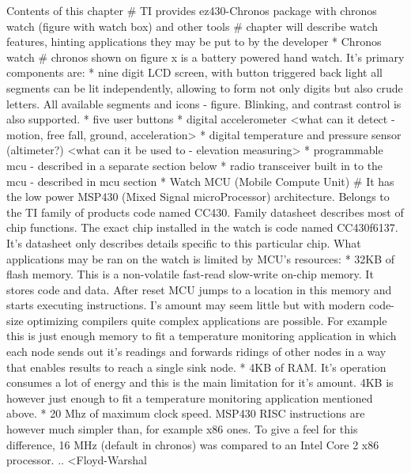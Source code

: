 \begin{commnet}
  Contents of this chapter
    # TI provides ez430-Chronos package with chronos watch (figure with watch box) and
      other tools
    # chapter will describe watch features, hinting applications they may be put to
      by the developer
    * Chronos watch
      # chronos shown on figure x is a battery powered hand watch. It's
        primary components are:
      * nine digit LCD screen, with button triggered back light all segments can
        be lit independently, allowing to form not only digits but also crude
        letters. All available segments and icons - figure. Blinking, and
        contrast control is also supported.
      * five user buttons
      * digital accelerometer
        <what can it detect - motion, free fall, ground, acceleration>
      * digital temperature and pressure sensor (altimeter?)
        <what can it be used to - elevation measuring>
      * programmable mcu - described in a separate section below
      * radio transceiver built in to the mcu - described in mcu section
    * Watch MCU (Mobile Compute Unit)
      # It has the low power MSP430 (Mixed Signal microProcessor) architecture.
        Belongs to the TI family of products code named CC430. Family datasheet
        describes most of chip functions.  The exact chip installed in the
        watch is code named CC430f6137. It's datasheet only describes details
        specific to this particular chip. What applications may be ran on the
        watch is limited by MCU's resources:
        * 32KB of flash memory. This is a non-volatile fast-read slow-write
          on-chip memory. It stores code and data. After reset MCU jumps to a
          location in this memory and starts executing instructions. I's amount
          may seem little but with modern code-size optimizing compilers quite
          complex applications are possible. For example this is just enough
          memory to fit a temperature monitoring application in which each node
          sends out it's readings and forwards ridings of other nodes in a way
          that enables results to reach a single sink node.
        * 4KB of RAM. It's operation consumes a lot of energy and this is the
          main limitation for it's amount. 4KB is however just enough to fit a
          temperature
          monitoring application mentioned above.
        * 20 Mhz of maximum clock speed. MSP430 RISC instructions are
          however much simpler than, for example x86 ones. To give a
          feel for this difference, 16 MHz (default in chronos) was
          compared to an Intel Core 2 x86 processor. .. <Floyd-Warshal

\end{commnet}
